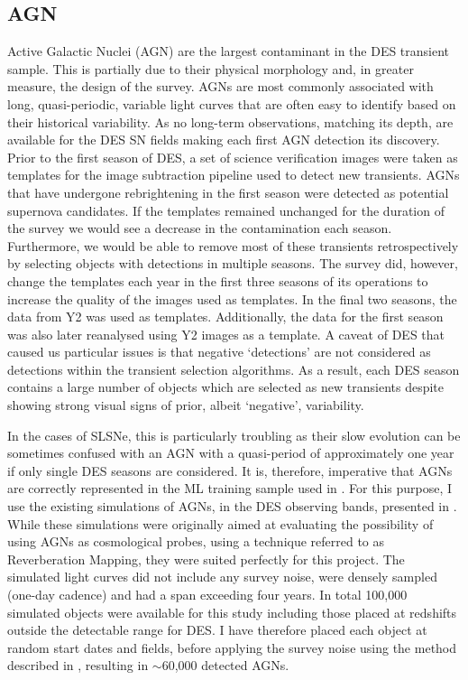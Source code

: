 \subsection{AGN} \label{sec:AGN}
Active Galactic Nuclei (AGN) are the largest contaminant in the DES transient sample. This is partially due to their physical morphology and, in greater measure, the design of the survey. AGNs are most commonly associated with long, quasi-periodic, variable light curves that are often easy to identify based on their historical variability. As no long-term observations, matching its depth, are available for the DES SN fields making each first AGN detection its discovery. Prior to the first season of DES, a set of science verification images were taken as templates for the image subtraction pipeline used to detect new transients. AGNs that have undergone rebrightening in the first season were detected as potential supernova candidates. If the templates remained unchanged for the duration of the survey we would see a decrease in the contamination each season. Furthermore, we would be able to remove most of these transients retrospectively by selecting objects with detections in multiple seasons. The survey did, however, change the templates each year in the first three seasons of its operations to increase the quality of the images used as templates. In the final two seasons, the data from Y2 was used as templates. Additionally, the data for the first season was also later reanalysed using Y2 images as a template. A caveat of DES that caused us particular issues is that negative `detections' are not considered as detections within the transient selection algorithms. As a result, each DES season contains a large number of objects which are selected as new transients despite showing strong visual signs of prior, albeit `negative', variability.

In the cases of SLSNe, this is particularly troubling as their slow evolution can be sometimes confused with an AGN with a quasi-period of approximately one year if only single DES seasons are considered. It is, therefore, imperative that AGNs are correctly represented in the ML training sample used in . For this purpose, I use the existing simulations of AGNs, in the DES observing bands, presented in \citet{Honig2016}. While these simulations were originally aimed at evaluating the possibility of using AGNs as cosmological probes, using a technique referred to as Reverberation Mapping, they were suited perfectly for this project. The simulated light curves did not include any survey noise, were densely sampled (one-day cadence) and had a span exceeding four years. In total 100,000 simulated objects were available for this study including those placed at redshifts outside the detectable range for DES. I have therefore placed each object at random start dates and fields, before applying the survey noise using the method described in , resulting in $\sim$60,000 detected AGNs.

